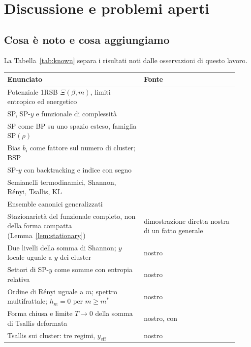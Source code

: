 \section{Discussione e problemi aperti}
\label{sec:discussion}

\subsection{Cosa è noto e cosa aggiungiamo}

La Tabella~\ref{tab:known} separa i risultati noti dalle osservazioni di questo lavoro.

\begin{table}[t]
\centering
\small
\begin{tabular}{@{}p{0.55\linewidth}p{0.38\linewidth}@{}}
\toprule
Enunciato & Fonte \\
\midrule
Potenziale 1RSB $\Xi(\beta,m)$, limiti entropico ed energetico & \citep{monasson1995structural,mezard2003cavity,mezard2002random} \\
SP, SP-$y$ e funzionale di complessità & \citep{mezard2002analytic,mezard2002random,braunstein2005survey} \\
SP come BP su uno spazio esteso, famiglia SP$(\rho)$ & \citep{braunstein2004surveybp,maneva2007survey} \\
Bias $b_i$ come fattore sul numero di cluster; BSP & \citep{marino2016bsp} \\
SP-$y$ con backtracking e indice con segno & \citep{battaglia2004minimizing} \\
Semianelli termodinamici, Shannon, Rényi, Tsallis, KL & \citep{marcolli2014thermodynamic} \\
Ensemble canonici generalizzati & \citep{costeniuc2005generalized,costeniuc2006generalized} \\
\midrule
Stazionarietà del funzionale completo, non della forma compatta (Lemma~\ref{lem:stationary}) & dimostrazione diretta nostra di un fatto generale~\citep{yedidia2005constructing} \\
Due livelli della somma di Shannon; $y$ locale uguale a $y$ dei cluster & nostro \\
Settori di SP-$y$ come somme con entropia relativa & nostro \\
Ordine di Rényi uguale a $m$; spettro multifrattale; $h_m=0$ per $m\ge m^*$ & nostro \\
Forma chiusa e limite $T\to0$ della somma di Tsallis deformata & nostro, con~\citep{curado1991generalized} \\
Tsallis sui cluster: tre regimi, $y_{\mathrm{eff}}$ & nostro \\

\end{tabular}
\end{table}
